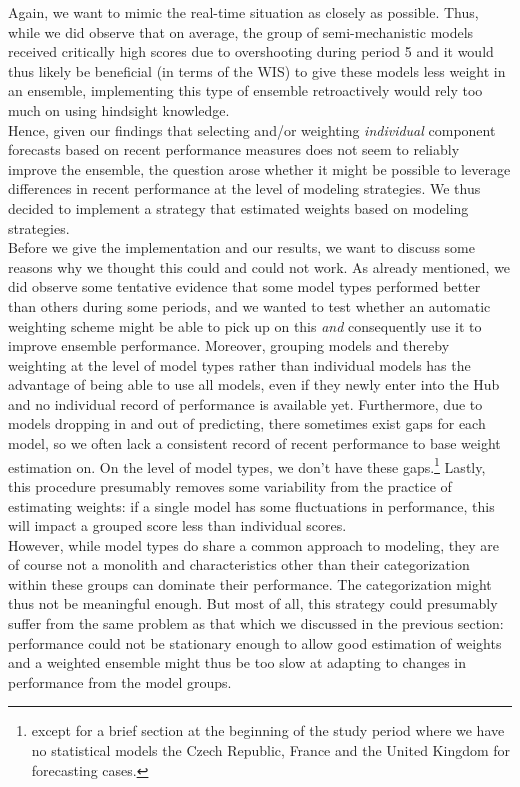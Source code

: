 Again, we want to mimic the real-time situation as closely as possible. Thus, while we did observe that on average, the group of semi-mechanistic models received critically high scores due to overshooting during period 5 and it would thus likely be beneficial (in terms of the WIS) to give these models less weight in an ensemble, implementing this type of ensemble retroactively would rely too much on using hindsight knowledge. \\
Hence, given our findings that selecting and/or weighting \textit{individual} component forecasts based on recent performance measures does not seem to reliably improve the ensemble, the question arose whether it might be possible to leverage differences in recent performance at the level of modeling strategies. We thus decided to implement a strategy that estimated weights based on modeling strategies. \\
Before we give the implementation and our results, we want to discuss some reasons why we thought this could and could not work. As already mentioned, we did observe some tentative evidence that some model types performed better than others during some periods, and we wanted to test whether an automatic weighting scheme might be able to pick up on this \textit{and} consequently use it to improve ensemble performance. Moreover, grouping models and thereby weighting at the level of model types rather than individual models has the advantage of being able to use all models, even if they newly enter into the Hub and no individual record of performance is available yet. Furthermore, due to models dropping in and out of predicting, there sometimes exist gaps for each model, so we often lack a consistent record of recent performance to base weight estimation on. On the level of model types, we don't have these gaps.\footnote{except for a brief section at the beginning of the study period where we have no statistical models the Czech Republic, France and the United Kingdom for forecasting cases.} Lastly, this procedure presumably removes some variability from the practice of estimating weights: if a single model has some fluctuations in performance, this will impact a grouped score less than individual scores.\\
However, while model types do share a common approach to modeling, they are of course not a monolith and characteristics other than their categorization within these groups can dominate their performance. The categorization might thus not be meaningful enough. But most of all, this strategy could presumably suffer from the same problem as that which we discussed in the previous section: performance could not be stationary enough to allow good estimation of weights and a weighted ensemble might thus be too slow at adapting to changes in performance from the model groups. \medskip \\
